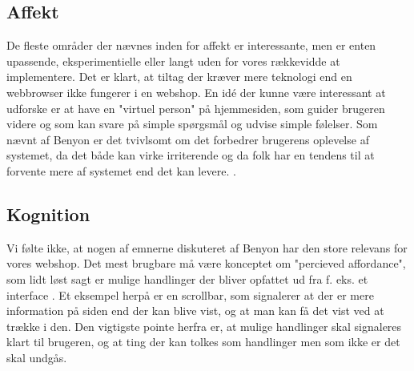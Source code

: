 \subsection{Affekt}
De fleste områder der nævnes inden for affekt er interessante, men er enten upassende, eksperimentielle eller langt uden for vores rækkevidde at
implementere. Det er klart, at tiltag der kræver mere teknologi end en webbrowser ikke fungerer i en webshop. En idé der kunne være interessant
at udforske er at have en "virtuel person" på hjemmesiden, som guider brugeren videre og som kan svare på simple spørgsmål og udvise simple følelser.
Som nævnt af Benyon er det tvivlsomt om det forbedrer brugerens oplevelse af systemet, da det både kan virke irriterende og da folk har en tendens
til at forvente mere af systemet end det kan levere. \cite[s. 571]{Benyon2010}.

\subsection{Kognition}
Vi følte ikke, at nogen af emnerne diskuteret af Benyon har den store relevans for vores webshop. Det mest brugbare må være konceptet om
"percieved affordance", som lidt løst sagt er mulige handlinger der bliver opfattet ud fra f. eks. et interface \cite[s.588]{Benyon}. Et
eksempel herpå er en scrollbar, som signalerer at der er mere information på siden end der kan blive vist, og at man kan få det vist ved at
trække i den. Den vigtigste pointe herfra er, at mulige handlinger skal signaleres klart til brugeren, og at ting der kan tolkes som handlinger
men som ikke er det skal undgås.

